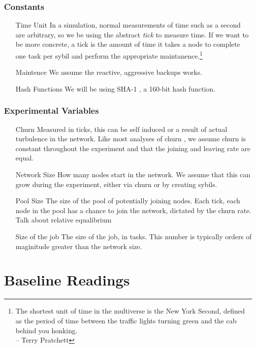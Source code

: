 \subsubsection{Constants}

\begin{enumerate}
	\item[Time Unit] In a simulation, normal measurements of time such as a second are arbitrary, so we be using the abstract \textit{tick} to measure time.  
	If we want to be more concrete, a tick is the amount of time it takes a node to complete one task per sybil and perform the appropriate maintanence.\footnote{The shortest unit of time in the multiverse is the New York Second, defined as the period of time between the traffic lights turning green and the cab behind you honking.\\-- Terry Pratchett}
	\item[Maintence] We assume the reactive, aggressive backups works.
	\item[Hash Functions] We will be using SHA-1 \cite{sha1}, a 160-bit hash function.
\end{enumerate}

\subsubsection{Experimental Variables}
\begin{enumerate}
	\item[Churn] Measured in ticks, this can be self induced or a result of actual turbulence in the network.
	Like most analyses of churn \cite{marozzo2012p2p}, we assume churn is constant throughout the experiment and that the joining and leaving rate are equal.
	\item[Network Size]  How many nodes start in the network.  
		We assume that this can grow during the experiment, either via churn or by creating sybils.
	\item[Pool Size]  The size of the pool of potentially joining nodes.  Each tick, each node in the pool has a chance to join the network, dictated by the churn rate.
		Talk about relative equalibrium
	\item[Size of the job] The size of the job, in tasks.
		This number is typically orders of maginitude greater than the network size.
\end{enumerate}



\section{Baseline Readings}


